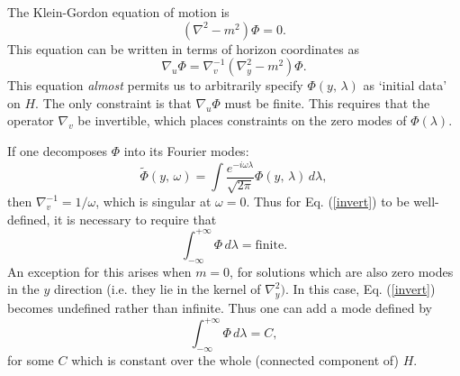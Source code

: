 \documentclass[12pt]{article}
\begin{document}

The Klein-Gordon equation of motion is
\begin{equation}
(\nabla^2 - m^2)\Phi = 0.
\end{equation}
This equation can be written in terms of horizon coordinates as
\begin{equation}\label{invert}
\nabla_u \Phi = \nabla_v^{-1} (\nabla_y^2 - m^2)\Phi.
\end{equation}
This equation \emph{almost} permits us to arbitrarily specify $\Phi(y,\,\lambda)$ as `initial data' on $H$.  The only constraint is that $\nabla_u \Phi$ must be finite.  This requires that the operator $\nabla_v$ be invertible, which places constraints on the zero modes of $\Phi(\lambda)$.

If one decomposes $\Phi$ into its Fourier modes:
\begin{equation}\label{omega0}
\tilde{\Phi}(y,\,\omega) = \int
\frac{e^{-i\omega \lambda}}{\sqrt{2\pi}} \Phi(y,\,\lambda)\,d\lambda,
\end{equation}
then $\nabla_v^{-1} = 1/\omega$, which is singular at $\omega = 0$.  Thus for Eq. (\ref{invert}) to be well-defined, it is necessary to require that
\begin{equation}\label{zeromode}
\int_{-\infty}^{+\infty} \Phi\,d\lambda = \mathrm{finite}.
\end{equation}
An exception for this arises when $m = 0$, for solutions which are also zero modes in the $y$ direction (i.e. they lie in the kernel of $\nabla_y^2)$.  In this case, Eq. (\ref{invert}) becomes undefined rather than infinite.  Thus one can add a mode defined by
\begin{equation}\label{zero}
\int^{+\infty}_{-\infty} \Phi\,d\lambda = C,
\end{equation}
for some $C$ which is constant over the whole (connected component of) $H$.
\end{document}
